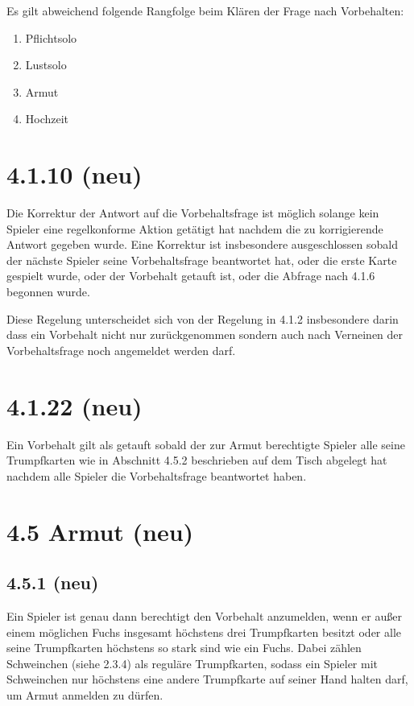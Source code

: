 Es gilt abweichend folgende Rangfolge beim Klären der Frage nach
Vorbehalten:

\begin{enumerate}
    \item Pflichtsolo
    \item Lustsolo
    \item Armut
    \item Hochzeit
\end{enumerate}

\section*{4.1.10 (neu)}

Die Korrektur der Antwort auf die Vorbehaltsfrage ist möglich solange kein
Spieler eine regelkonforme Aktion getätigt hat nachdem die zu korrigierende Antwort gegeben
wurde. Eine Korrektur ist insbesondere ausgeschlossen sobald der nächste Spieler seine Vorbehaltsfrage beantwortet
hat, oder die erste Karte gespielt wurde, oder der Vorbehalt getauft ist, oder
die Abfrage nach 4.1.6 begonnen wurde.

Diese Regelung unterscheidet sich von der Regelung in 4.1.2 insbesondere
darin dass ein Vorbehalt nicht nur zurückgenommen sondern auch nach Verneinen
der Vorbehaltsfrage noch angemeldet werden darf.

\section*{4.1.22 (neu)}

Ein Vorbehalt gilt als  getauft sobald der zur Armut berechtigte
Spieler alle seine Trumpfkarten wie in Abschnitt 4.5.2 beschrieben auf dem Tisch
abgelegt hat nachdem alle Spieler die Vorbehaltsfrage beantwortet haben.

\section*{4.5 Armut (neu)}

\subsection*{4.5.1 (neu)}
Ein Spieler ist genau dann berechtigt den Vorbehalt 
anzumelden, wenn er außer einem möglichen Fuchs insgesamt höchstens
drei Trumpfkarten besitzt oder alle seine Trumpfkarten höchstens so
stark sind wie ein Fuchs. Dabei zählen Schweinchen (siehe 2.3.4) als
reguläre Trumpfkarten, sodass ein Spieler mit Schweinchen nur
höchstens eine andere Trumpfkarte auf seiner Hand halten darf, um Armut
anmelden zu dürfen.

